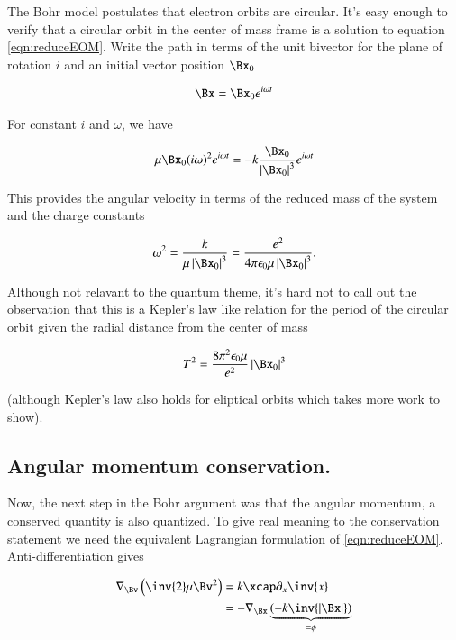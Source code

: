 \documentclass{article}
\begin{document}
The Bohr model postulates that electron orbits are circular.  It's easy enough to verify that a circular orbit in the center of mass frame is a solution to equation
\ref{eqn:reduceEOM}.   Write the path in terms of the unit bivector for the plane of rotation $i$ and an initial vector position $\Bx_0$

\begin{align}\label{eqn:circular}
\Bx = \Bx_0 e^{i \omega t}
\end{align}

For constant $i$ and $\omega$, we have

\begin{align*}
\mu \Bx_0 (i\omega)^2 e^{i\omega t} = - k \frac{\Bx_0}{\Abs{\Bx_0}^3} e^{i\omega t}
\end{align*}

This provides the 
angular velocity in terms of the reduced mass of the system and the charge constants

\begin{align}\label{eqn:omegaSquared}
\omega^2 = \frac{k}{\mu \Abs{\Bx_0}^3} = \frac{e^2}{4 \pi \epsilon_0 \mu \Abs{\Bx_0}^3}.
\end{align}

Although not relavant to the quantum theme, it's hard not to call out the observation that this is
a Kepler's law like relation for the period of the circular orbit given the radial distance from the center of mass

\begin{align*}
T^2 = \frac{8 \pi^2 \epsilon_0 \mu}{e^2} \Abs{\Bx_0}^3
\end{align*}

(although Kepler's law also holds for eliptical orbits which takes more work to show).

\subsection{ Angular momentum conservation. }

Now, the next step in the Bohr argument was that the angular momentum, a conserved quantity is also quantized.  To give real
meaning to the conservation statement we need the equivalent Lagrangian formulation of \ref{eqn:reduceEOM}.  Anti-differentiation
gives

\begin{align*}
\grad_\Bv \left( \inv{2} \mu \Bv^2 \right) 
&= k \xcap \partial_x \inv{x} \\
&= - \grad_\Bx \underbrace{\left(- k\inv{\Abs{\Bx}}\right)}_{=\phi}
\end{align*}
\end{document}
